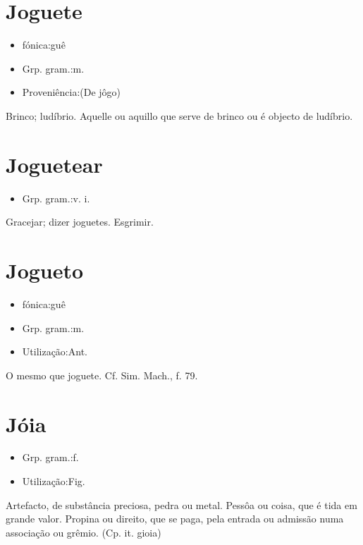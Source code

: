 \documentclass{article}
\begin{document}
\section{Joguete}
\begin{itemize}
\item {fónica:guê}
\end{itemize}
\begin{itemize}
\item {Grp. gram.:m.}
\end{itemize}
\begin{itemize}
\item {Proveniência:(De jôgo)}
\end{itemize}
Brinco; ludíbrio.
Aquelle ou aquillo que serve de brinco ou é objecto de ludíbrio.
\section{Joguetear}
\begin{itemize}
\item {Grp. gram.:v. i.}
\end{itemize}
Gracejar; dizer joguetes.
Esgrimir.
\section{Jogueto}
\begin{itemize}
\item {fónica:guê}
\end{itemize}
\begin{itemize}
\item {Grp. gram.:m.}
\end{itemize}
\begin{itemize}
\item {Utilização:Ant.}
\end{itemize}
O mesmo que \textunderscore joguete\textunderscore . Cf. Sim. Mach., f. 79.
\section{Jóia}
\begin{itemize}
\item {Grp. gram.:f.}
\end{itemize}
\begin{itemize}
\item {Utilização:Fig.}
\end{itemize}
Artefacto, de substância preciosa, pedra ou metal.
Pessôa ou coisa, que é tida em grande valor.
Propina ou direito, que se paga, pela entrada ou admissão numa associação ou grêmio.
(Cp. it. \textunderscore gioia\textunderscore )
\end{document}

